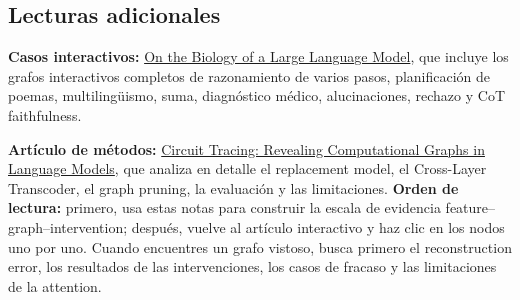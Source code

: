 \documentclass[a4paper]{article}
\begin{document}
\enlargethispage{4\baselineskip}
\subsection{Lecturas adicionales}

\small
\noindent\textbf{Casos interactivos: }\href{https://transformer-circuits.pub/2025/attribution-graphs/biology.html}{On the Biology of a Large Language Model}, que incluye los grafos interactivos completos de razonamiento de varios pasos, planificación de poemas, multilingüismo, suma, diagnóstico médico, alucinaciones, rechazo y CoT faithfulness.

\noindent\textbf{Artículo de métodos: }\href{https://transformer-circuits.pub/2025/attribution-graphs/methods.html}{Circuit Tracing: Revealing Computational Graphs in Language Models}, que analiza en detalle el replacement model, el Cross-Layer Transcoder, el graph pruning, la evaluación y las limitaciones. \textbf{Orden de lectura: }primero, usa estas notas para construir la escala de evidencia feature--graph--intervention; después, vuelve al artículo interactivo y haz clic en los nodos uno por uno. Cuando encuentres un grafo vistoso, busca primero el reconstruction error, los resultados de las intervenciones, los casos de fracaso y las limitaciones de la attention.
\normalsize
\end{document}
